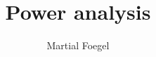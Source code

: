 \usepackage{appendixnumberbeamer}

\usepackage{booktabs}
\usepackage[scale=2]{ccicons}

\usepackage{pgfplots}

\usepackage{xspace}
\newcommand{\themename}{\textbf{\textsc{metropolis}}\xspace}


\usepackage{multirow}

\title{Power analysis}
\date{}
\author{Martial Foegel}
